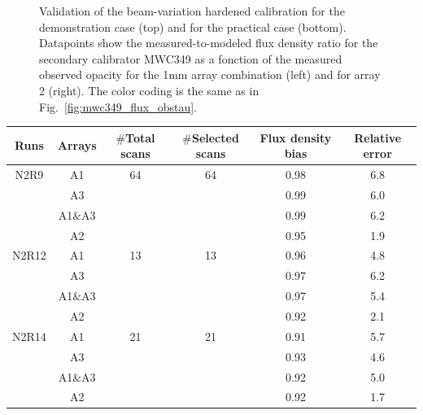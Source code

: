 \begin{figure}[ht!]
\begin{center}
    \caption[Validation of the beam-variation hardened calibration
      using MWC349 flux density]{Validation
      of the beam-variation hardened calibration for the demonstration
      case (top) and for the practical case (bottom).
      Datapoints show the measured-to-modeled flux density ratio for the
      secondary calibrator MWC349 as a fonction
      of the measured observed opacity for the 1mm array combination
      (left) and for array 2 (right). The color coding is the same as
      in Fig.~\ref{fig:mwc349_flux_obstau}.
    }
    \label{fig:mwc349_flux_obstau_photocorr}
  \end{center}
\end{figure}



\begin{table}[th]
\begin{center}
\begin{tabular}{|c|c|cccc|}
\hline
Runs & Arrays & $\#$Total scans   & $\#$Selected scans & Flux density bias  & Relative error \\ 
\hline\hline
 N2R9   & A1        & 64                 &  64         & 0.98               &  6.8    \\ 
        & A3        &                    &             & 0.99               &  6.0     \\ 
        & A1$\&$A3  &                    &             & 0.99               &  6.2    \\ 
        & A2        &                    &             & 0.95               &  1.9    \\ 
 \hline
 N2R12  & A1        & 13                 &  13         & 0.96               &  4.8    \\ 
        & A3        &                    &             & 0.97               &  6.2    \\ 
        & A1$\&$A3  &                    &             & 0.97               &  5.4    \\ 
        & A2        &                    &             & 0.92               &  2.1     \\
 \hline
 N2R14  & A1        & 21                 &  21         & 0.91               &  5.7  \\ 
        & A3        &                    &             & 0.93               &  4.6   \\ 
        & A1$\&$A3  &                    &             & 0.92               &  5.0   \\ 
        & A2        &                    &             & 0.92               &  1.7   \\

\end{tabular}
\end{center}
\end{table}
